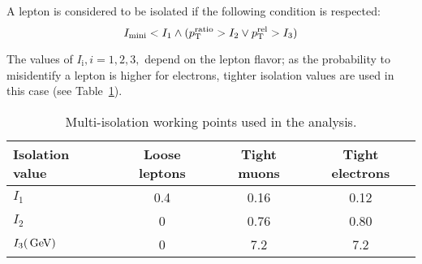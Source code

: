 A lepton is considered to be isolated if the following condition is respected:
\begin{equation}
  I_\text{mini} < I_1 \wedge ( p_{\mathrm{T}}^\text{ratio} > I_2 \vee p_{\mathrm{T}}^\text{rel} > I_3 )
\end{equation}

The values of $I_\text{i}, i = 1,2,3,$ depend on the lepton flavor; as the probability to misidentify a lepton is higher for electrons, 
tighter isolation values are used in this case (see Table~\ref{tab:isoWPs}). 
\begin{table}[h]
  \begin{center}
    \caption{\label{tab:isoWPs}Multi-isolation working points used in the analysis.}
    \begin{tabular}{l|c|c|c}
      \hline
      Isolation value & Loose leptons  & Tight muons & Tight electrons  \\
      \hline\hline
      $I_1$ & 0.4 & 0.16 & 0.12 \\
      $I_2$ & 0 & 0.76 & 0.80 \\
      $I_3 (\,\text{Ge\hspace{-.08em}V})$ & 0 & 7.2 & 7.2 \\
      \hline
    \end{tabular}
  \end{center}
\end{table}

